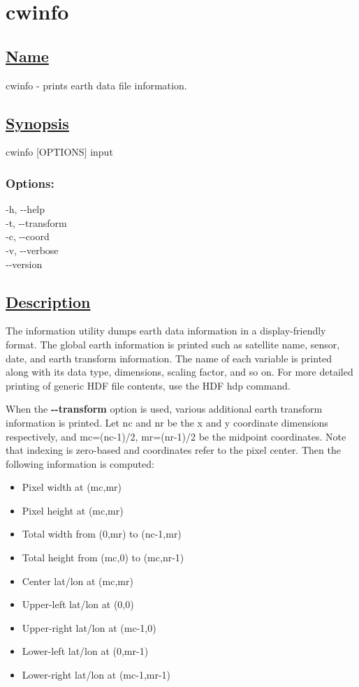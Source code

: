 \newpage
\section{cwinfo} \hypertarget{cwinfo}{}
\subsection*{\underline{Name}}


   cwinfo - prints earth data file information.  
\subsection*{\underline{Synopsis}}


  cwinfo [OPTIONS] input 
\subsubsection*{Options:}


  -h, -{-}help \\ 
 -t, -{-}transform \\ 
 -c, -{-}coord \\ 
 -v, -{-}verbose \\ 
 -{-}version \\ 

\subsection*{\underline{Description}}


  The information utility dumps earth data information in a display-friendly format. The global earth information is printed such as satellite name, sensor, date, and earth transform information. The name of each variable is printed along with its data type, dimensions, scaling factor, and so on. For more detailed printing of generic HDF file contents, use the HDF hdp command. 


 When the \textbf{-{-}transform}
 option is used, various additional earth transform information is printed. Let nc and nr be the x and y coordinate dimensions respectively, and mc=(nc-1)/2, mr=(nr-1)/2 be the midpoint coordinates. Note that indexing is zero-based and coordinates refer to the pixel center. Then the following information is computed:
\begin{itemize}
\item Pixel width at (mc,mr)
\item Pixel height at (mc,mr)
\item Total width from (0,mr) to (nc-1,mr)
\item Total height from (mc,0) to (mc,nr-1)
\item Center lat/lon at (mc,mr)
\item Upper-left lat/lon at (0,0)
\item Upper-right lat/lon at (mc-1,0)
\item Lower-left lat/lon at (0,mr-1)
\item Lower-right lat/lon at (mc-1,mr-1)

\end{itemize}


